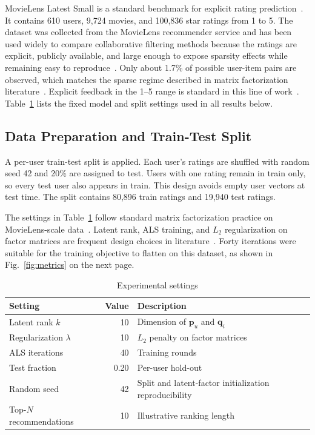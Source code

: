 \documentclass[conference]{IEEEtran}
\begin{document}
MovieLens Latest Small is a standard benchmark for explicit rating prediction~\cite{ref13}. It contains 610 users, 9,724 movies, and 100,836 star ratings from 1 to 5. The dataset was collected from the MovieLens recommender service and has been used widely to compare collaborative filtering methods because the ratings are explicit, publicly available, and large enough to expose sparsity effects while remaining easy to reproduce~\cite{ref13}. Only about 1.7\% of possible user-item pairs are observed, which matches the sparse regime described in matrix factorization literature~\cite{ref3,ref4}. Explicit feedback in the 1--5 range is standard in this line of work~\cite{ref3,ref4}. Table~\ref{tab:hparams} lists the fixed model and split settings used in all results below.

\subsection{Data Preparation and Train-Test Split}

A per-user train-test split is applied. Each user's ratings are shuffled with random seed 42 and 20\% are assigned to test. Users with one rating remain in train only, so every test user also appears in train. This design avoids empty user vectors at test time. The split contains 80,896 train ratings and 19,940 test ratings.

The settings in Table~\ref{tab:hparams} follow standard matrix factorization practice on MovieLens-scale data~\cite{ref1,ref2}. Latent rank, ALS training, and $L_2$ regularization on factor matrices are frequent design choices in literature~\cite{ref1,ref2,ref6}. Forty iterations were suitable for the training objective to flatten on this dataset, as shown in Fig.~\ref{fig:metrics} on the next page.

\begin{table}[htbp]
\caption{Experimental settings}
\label{tab:hparams}
\begin{center}
\begin{tabular}{|l|r|l|}
\hline
\textbf{Setting} & \textbf{Value} & \textbf{Description} \\
\hline
Latent rank $k$ & 10 & Dimension of $\mathbf{p}_u$ and $\mathbf{q}_i$ \\
Regularization $\lambda$ & 10 & $L_2$ penalty on factor matrices \\
ALS iterations & 40 & Training rounds \\
Test fraction & 0.20 & Per-user hold-out \\
Random seed & 42 & Split and latent-factor initialization reproducibility \\
Top-$N$ recommendations & 10 & Illustrative ranking length \\
\hline
\end{tabular}
\end{center}
\end{table}
\end{document}

